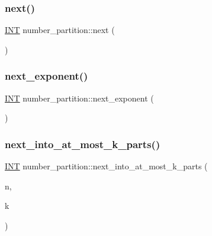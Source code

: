 \mbox{\label{classnumber__partition_a4a374717cef3ac7d21308151a19f7ec0}} 
\subsubsection{\texorpdfstring{next()}{next()}}
{\footnotesize\ttfamily \mbox{\hyperlink{galois_8h_a09fddde158a3a20bd2dcadb609de11dc}{I\+NT}} number\+\_\+partition\+::next (\begin{DoxyParamCaption}{ }\end{DoxyParamCaption})}

\mbox{\label{classnumber__partition_a245a7821bacd491c54b56080f2ecbd51}} 
\subsubsection{\texorpdfstring{next\+\_\+exponent()}{next\_exponent()}}
{\footnotesize\ttfamily \mbox{\hyperlink{galois_8h_a09fddde158a3a20bd2dcadb609de11dc}{I\+NT}} number\+\_\+partition\+::next\+\_\+exponent (\begin{DoxyParamCaption}{ }\end{DoxyParamCaption})}

\mbox{\label{classnumber__partition_a5fe0dbb26444dd0f5a487dacb93e715b}} 
\subsubsection{\texorpdfstring{next\+\_\+into\+\_\+at\+\_\+most\+\_\+k\+\_\+parts()}{next\_into\_at\_most\_k\_parts()}}
{\footnotesize\ttfamily \mbox{\hyperlink{galois_8h_a09fddde158a3a20bd2dcadb609de11dc}{I\+NT}} number\+\_\+partition\+::next\+\_\+into\+\_\+at\+\_\+most\+\_\+k\+\_\+parts (\begin{DoxyParamCaption}\item[{\mbox{\hyperlink{galois_8h_a09fddde158a3a20bd2dcadb609de11dc}{I\+NT}}}]{n,  }\item[{\mbox{\hyperlink{galois_8h_a09fddde158a3a20bd2dcadb609de11dc}{I\+NT}}}]{k }\end{DoxyParamCaption})}

